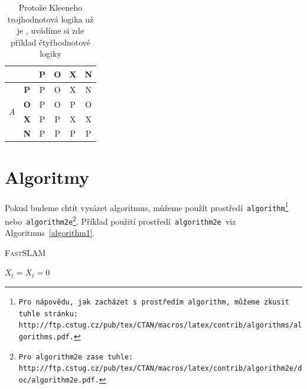 \documentclass[a4paper, 11pt] {article}
\begin{document}
\begin{table}[h]
\begin{tabular}{|c|c|c|c|c|c|}
\multicolumn{2}{|c|}{}             & \textbf{P} & \textbf{O} & \textbf{X} & \textbf{N}\\ \hline
\multirow{4}{*}{$A$}  & \textbf{P} & P          & O          & X          & N         \\ \cline{2-6} 
                      & \textbf{O} & P          & O          & P          & O         \\ \cline{2-6} 
                      & \textbf{X} & P          & P          & X          & X         \\ \cline{2-6} 
                      & \textbf{N} & P          & P          & P          & P         \\ \hline
\end{tabular}
\caption{Protože Kleeneho trojhodnotová logika už je , uvádíme si zde příklad čtyřhodnotové logiky}
\label{table2}
\end{table}
\bigskip\pagebreak

\section{Algoritmy}\label{section:algoritmy}
Pokud budeme chtít vysázet algoritmus, můžeme použít prostředí\texttt{ algorithm\footnote{Pro nápovědu, jak zacházet s~prostředím\texttt{ algorithm,} můžeme zkusit tuhle stránku:\\ http://ftp.cstug.cz/pub/tex/CTAN/macros/latex/contrib/algorithms/algorithms.pdf.} }nebo\texttt{ algorithm2e\footnote{Pro\texttt{ algorithm2e }zase tuhle: http://ftp.cstug.cz/pub/tex/CTAN/macros/latex/contrib/algorithm2e/doc/algorithm2e.pdf.}}. Příklad použití prostředí\texttt{ algorithm2e }viz Algoritmus~\ref{algorithm1}.
\bigskip
\IncMargin{1.5em}
\begin{algorithm}
\label{algorithm1}
\caption{\textsc{FastSLAM}}

\SetNlSty{}{}{:}
\SetNlSkip{0.4em}
\SetInd{1em}{1em}

\Indmm\Indm
{}
\Indpp\Indp

\BlankLine
$\overline{X_t} = X_t = 0$\\


\end{algorithm}
\DecMargin{1.5em}
\end{document}
